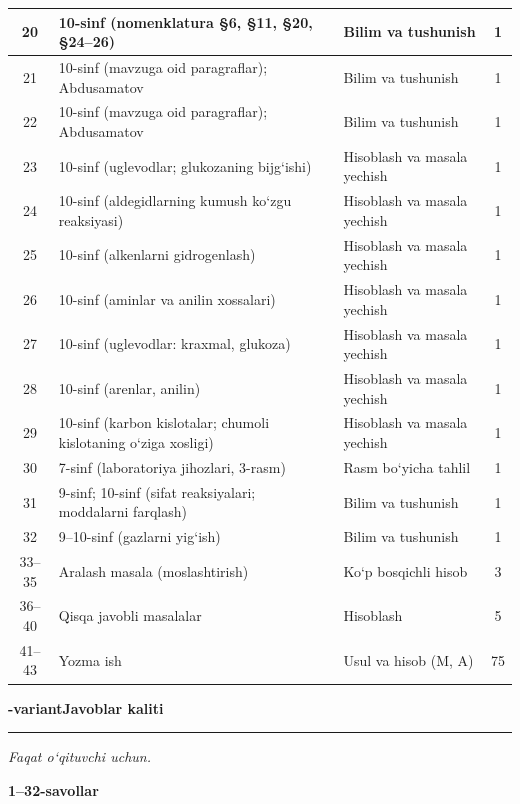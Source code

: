 \documentclass[11pt,a4paper]{article}
\newcommand{\hdrpill}[1]{\begin{tikzpicture}[baseline=0pt]\node[fill=ygreen,text=white,rounded corners=8pt,inner xsep=10pt,inner ysep=5pt,font=\fontsize{13}{15}\bfseries\selectfont] at (0,0.475){#1};\end{tikzpicture}}
\newcommand{\curvar}{}\fancyhead[R]{\hdrpill{\curvar}}
\begin{document}
{\begin{longtable}{|c|p{7.2cm}|p{5.4cm}|c|}
20 & 10-sinf (nomenklatura \S{}6, \S{}11, \S{}20, \S{}24--26) & Bilim va tushunish & 1\\\hline
21 & 10-sinf (mavzuga oid paragraflar); Abdusamatov & Bilim va tushunish & 1\\\hline
22 & 10-sinf (mavzuga oid paragraflar); Abdusamatov & Bilim va tushunish & 1\\\hline
23 & 10-sinf (uglevodlar; glukozaning bijg`ishi) & Hisoblash va masala yechish & 1\\\hline
24 & 10-sinf (aldegidlarning kumush ko`zgu reaksiyasi) & Hisoblash va masala yechish & 1\\\hline
25 & 10-sinf (alkenlarni gidrogenlash) & Hisoblash va masala yechish & 1\\\hline
26 & 10-sinf (aminlar va anilin xossalari) & Hisoblash va masala yechish & 1\\\hline
27 & 10-sinf (uglevodlar: kraxmal, glukoza) & Hisoblash va masala yechish & 1\\\hline
28 & 10-sinf (arenlar, anilin) & Hisoblash va masala yechish & 1\\\hline
29 & 10-sinf (karbon kislotalar; chumoli kislotaning o`ziga xosligi) & Hisoblash va masala yechish & 1\\\hline
30 & 7-sinf (laboratoriya jihozlari, 3-rasm) & Rasm bo`yicha tahlil & 1\\\hline
31 & 9-sinf; 10-sinf (sifat reaksiyalari; moddalarni farqlash) & Bilim va tushunish & 1\\\hline
32 & 9--10-sinf (gazlarni yig`ish) & Bilim va tushunish & 1\\\hline
33--35 & Aralash masala (moslashtirish) & Ko`p bosqichli hisob & 3\\\hline
36--40 & Qisqa javobli masalalar & Hisoblash & 5\\\hline
41--43 & Yozma ish & Usul va hisob (M, A) & 75\\\hline
\end{longtable}}
\renewcommand{\curvar}{Javoblar}
\newpage
\noindent\textbf{\fontsize{13}{15}-variant}\hfill \textbf{Javoblar kaliti}\par\smallskip\hrule\smallskip
\textit{Faqat o`qituvchi uchun.}\par\medskip
\noindent\textbf{1--32-savollar}\par\smallskip
\end{document}
